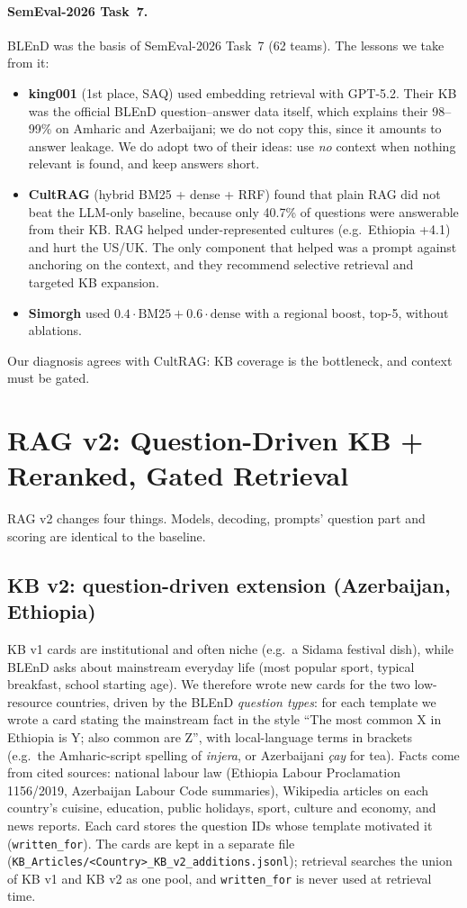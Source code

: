 \documentclass[11pt]{article}
\begin{document}
\paragraph{SemEval-2026 Task~7.} BLEnD was the basis of SemEval-2026 Task~7 (62 teams). The
lessons we take from it:
\begin{itemize}
\item \textbf{king001} (1st place, SAQ) used embedding retrieval with GPT-5.2. Their KB was the official
BLEnD question--answer data itself, which explains their 98--99\% on Amharic and Azerbaijani; we do not
copy this, since it amounts to answer leakage. We do adopt two of their ideas: use \emph{no} context when
nothing relevant is found, and keep answers short.
\item \textbf{CultRAG} (hybrid BM25 + dense + RRF) found that plain RAG did not beat the LLM-only
baseline, because only 40.7\% of questions were answerable from their KB. RAG helped under-represented
cultures (e.g.\ Ethiopia +4.1) and hurt the US/UK. The only component that helped was a prompt against
anchoring on the context, and they recommend selective retrieval and targeted KB expansion.
\item \textbf{Simorgh} used $0.4\cdot\text{BM25}+0.6\cdot\text{dense}$ with a regional boost, top-5,
without ablations.
\end{itemize}
Our diagnosis agrees with CultRAG: KB coverage is the bottleneck, and context must be gated.

\section{RAG v2: Question-Driven KB + Reranked, Gated Retrieval}
\label{sec:ragv2}
RAG v2 changes four things. Models, decoding, prompts' question part and scoring are identical to
the baseline.

\subsection{KB v2: question-driven extension (Azerbaijan, Ethiopia)}
\label{sec:kbv2}
KB v1 cards are institutional and often niche (e.g.\ a Sidama festival dish), while BLEnD asks about
mainstream everyday life (most popular sport, typical breakfast, school starting age). We therefore
wrote new cards for the two low-resource countries, driven by the BLEnD \emph{question types}: for each
template we wrote a card stating the mainstream fact in the style ``The most common X in Ethiopia is
Y; also common are Z'', with local-language terms in brackets (e.g.\ the Amharic-script spelling of \emph{injera}, or
Azerbaijani \emph{\c{c}ay} for tea).
Facts come from cited sources: national labour law (Ethiopia Labour Proclamation 1156/2019,
Azerbaijan Labour Code summaries), Wikipedia articles on each country's cuisine, education, public
holidays, sport, culture and economy, and news reports. Each card stores the question IDs whose
template motivated it (\texttt{written\_for}). The cards are kept in a separate file
(\texttt{KB\_Articles/<Country>\_KB\_v2\_additions.jsonl}); retrieval searches the union of KB v1 and
KB v2 as one pool, and \texttt{written\_for} is never used at retrieval time.
\end{document}
